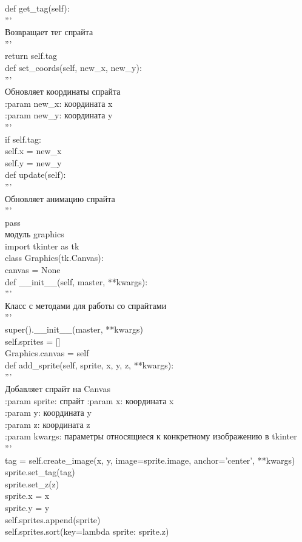 def get\_tag(self):\\
'''\\
Возвращает тег спрайта\\

'''\\
return self.tag\\

def set\_coords(self, new\_x, new\_y):\\
'''\\
Обновляет координаты спрайта\\

:param new\_x: координата x\\
:param new\_y: координата y\\
'''\\
if self.tag:\\
self.x = new\_x\\
self.y = new\_y\\
def update(self):\\
'''\\
Обновляет анимацию спрайта\\

'''\\
pass\\

модуль graphics\\

import tkinter as tk\\

class Graphics(tk.Canvas):\\
canvas = None\\
def \_\_init\_\_(self, master, **kwargs):\\
'''\\
Класс с методами для работы со спрайтами\\

'''\\
super().\_\_init\_\_(master, **kwargs)\\
self.sprites = []\\
Graphics.canvas = self\\

def add\_sprite(self, sprite, x, y, z, **kwargs):\\
'''\\
Добавляет спрайт на Canvas\\

:param sprite: спрайт
:param x: координата x\\
:param y: координата y\\
:param z: координата z\\
:param kwargs: параметры относящиеся к конкретному изображению в tkinter\\
'''\\
tag = self.create\_image(x, y, image=sprite.image, anchor='center', **kwargs)\\
sprite.set\_tag(tag)\\
sprite.set\_z(z)\\
sprite.x = x\\
sprite.y = y\\
self.sprites.append(sprite)\\
self.sprites.sort(key=lambda sprite: sprite.z)\\

